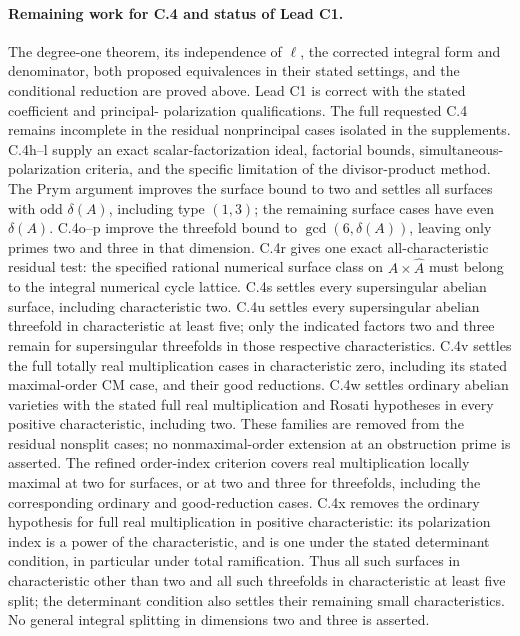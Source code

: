 












\paragraph{Remaining work for C.4 and status of Lead C1.}
The degree-one theorem, its independence of $\ell$, the corrected
integral form and denominator, both proposed equivalences in their
stated settings, and the conditional reduction are proved above.
Lead C1 is correct with the stated coefficient and principal-
polarization qualifications. The full requested C.4 remains
incomplete in the residual nonprincipal cases isolated in the
supplements. C.4h--l supply an exact scalar-factorization ideal,
factorial bounds, simultaneous-polarization criteria, and the specific
limitation of the divisor-product method. The Prym argument improves
the surface bound to two and settles all surfaces with odd
$\delta(A)$, including type $(1,3)$; the remaining surface cases have
even $\delta(A)$. C.4o--p improve the threefold bound to
$\gcd(6,\delta(A))$, leaving only primes two and three in that
dimension. C.4r gives one exact all-characteristic residual test:
the specified rational numerical surface class on $A\times\widehat A$
must belong to the integral numerical cycle lattice. C.4s settles
every supersingular abelian surface, including characteristic two.
C.4u settles every supersingular abelian threefold in
characteristic at least five; only the indicated factors two
and three remain for supersingular threefolds in those respective
characteristics.
C.4v settles the full totally real multiplication cases in
characteristic zero, including its stated maximal-order CM
case, and their good reductions. C.4w settles ordinary
abelian varieties with the stated full real multiplication
and Rosati hypotheses in every positive characteristic,
including two. These families are removed from the
residual nonsplit cases; no nonmaximal-order extension
at an obstruction prime is asserted. The refined order-index
criterion covers real multiplication locally maximal at two
for surfaces, or at two and three for threefolds, including
the corresponding ordinary and good-reduction cases.
C.4x removes the ordinary hypothesis for full real multiplication
in positive characteristic: its polarization index is a power
of the characteristic, and is one under the stated determinant
condition, in particular under total ramification. Thus all such
surfaces in characteristic other than two and all such threefolds
in characteristic at least five split; the determinant condition
also settles their remaining small characteristics.
No general integral splitting in dimensions two and three is
asserted.

